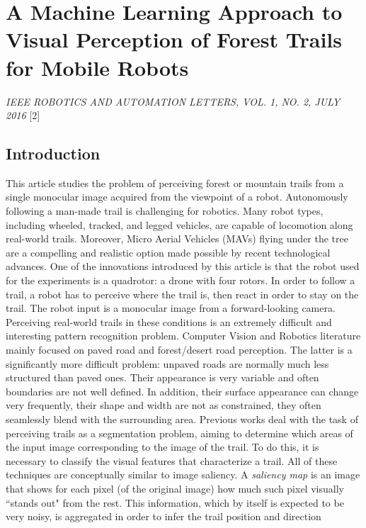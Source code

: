 \section{A Machine Learning Approach to Visual Perception of Forest
Trails for Mobile Robots}\label{header-n5}

\emph{IEEE ROBOTICS AND AUTOMATION LETTERS, VOL. 1, NO. 2, JULY 2016} {[}2{]}

\subsection{Introduction}\label{header-n7}

This article studies the problem of perceiving forest or mountain trails
from a single monocular image acquired from the viewpoint of a robot.
Autonomously following a man-made trail is challenging for robotics.
Many robot types, including wheeled, tracked, and legged vehicles, are
capable of locomotion along real-world trails. Moreover, Micro Aerial
Vehicles (MAVs) flying under the tree are a compelling and realistic
option made possible by recent technological advances. One of the
innovations introduced by this article is that the robot used for the
experiments is a quadrotor: a drone with four rotors. In order to follow
a trail, a robot has to perceive where the trail is, then react in order
to stay on the trail. The robot input is a monocular image from a
forward-looking camera. Perceiving real-world trails in these conditions
is an extremely difficult and interesting pattern recognition problem.
Computer Vision and Robotics literature mainly focused on paved road and
forest/desert road perception. The latter is a significantly more
difficult problem: unpaved roads are normally much less structured than
paved ones. Their appearance is very variable and often boundaries are
not well defined. In addition, their surface appearance can change very
frequently, their shape and width are not as constrained, they often
seamlessly blend with the surrounding area. Previous works deal with the
task of perceiving trails as a segmentation problem, aiming to determine
which areas of the input image corresponding to the image of the trail.
To do this, it is necessary to classify the visual features that
characterize a trail. All of these techniques are conceptually similar
to image saliency. A \emph{saliency map} is an image that shows for each
pixel (of the original image) how much such pixel visually ``stands out"
from the rest. This information, which by itself is expected to be very
noisy, is aggregated in order to infer the trail position and direction
